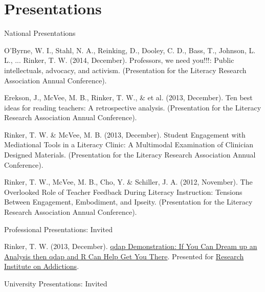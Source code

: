 \section{Presentations}
National Presentations
\begin{innerlist}

\item O'Byrne, W. I., Stahl, N. A., Reinking, D., Dooley, C. D., Bass, T., Johnson, L. L., ... Rinker, T. W. (2014, December). Professors, we need you!!!: Public intellectuals, advocacy, and activism. (Presentation for the Literacy Research Association Annual Conference).

\item Erekson, J., McVee, M. B., Rinker, T. W., \& et al. (2013, December). Ten best ideas for reading teachers: A retrospective analysis. (Presentation for the Literacy Research Association Annual Conference).

\item Rinker, T. W. \& McVee, M. B. (2013, December).  Student Engagement with Mediational Tools in a Literacy Clinic: A Multimodal Examination of Clinician Designed Materials.  (Presentation for the Literacy Research Association Annual Conference).

\item Rinker, T. W., McVee, M. B., Cho, Y. \& Schiller, J. A. (2012, November).  The Overlooked Role of Teacher Feedback During Literacy Instruction: Tensions Between Engagement, Embodiment, and Ipseity.  (Presentation for the Literacy Research Association Annual Conference).

\end{innerlist}

\halfblankline

Professional Presentations: Invited

\begin{innerlist}

    \item Rinker, T. W. (2013, December). \href{http://rpubs.com/trinker/11429}{qdap Demonstration: If You Can Dream up an Analysis then qdap and R Can Help Get You There}.  Presented for \href{http://www.buffalo.edu/ria.html}{Research Institute on Addictions}.

\end{innerlist}
    
\halfblankline

University Presentations: Invited

